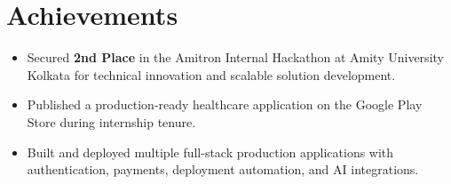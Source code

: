 \documentclass[letterpaper,10pt]{article}
\newcommand{\resumeItem}[1]{
    \item\small{#1 \vspace{-2pt}}
}
\newcommand{\resumeItemListStart}{\begin{itemize}[leftmargin=0.2in]}
\newcommand{\resumeItemListEnd}{\end{itemize}\vspace{-5pt}}
\begin{document}
\vspace{-4pt}

\section{Achievements}

\resumeItemListStart
    \resumeItem{Secured \textbf{2nd Place} in the Amitron Internal Hackathon at Amity University Kolkata for technical innovation and scalable solution development.}
    \resumeItem{Published a production-ready healthcare application on the Google Play Store during internship tenure.}
    \resumeItem{Built and deployed multiple full-stack production applications with authentication, payments, deployment automation, and AI integrations.}
\resumeItemListEnd

\end{document}
